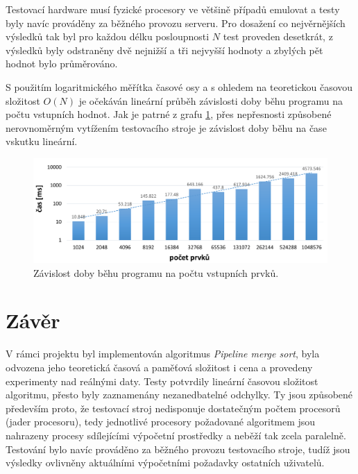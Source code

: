 \documentclass[12pt,a4paper,titlepage,final]{article}
\begin{document}
Testovací hardware musí fyzické procesory ve většině případů emulovat a testy byly navíc prováděny za běžného provozu serveru. Pro dosažení co nejvěrnějších výsledků tak byl pro každou délku posloupnosti $N$ test proveden desetkrát, z výsledků byly odstraněny dvě nejnižší a tři nejvyšší hodnoty a zbylých pět hodnot bylo průměrováno.

S použitím logaritmického měřítka časové osy a s ohledem na teoretickou časovou složitost $O(N)$ je očekáván lineární průběh závislosti doby běhu programu na počtu vstupních hodnot. Jak je patrné z grafu \ref{fig:CasVSPocetPrvku}, přes nepřesnosti způsobené nerovnoměrným vytížením testovacího stroje je závislost doby běhu na čase vskutku lineární.

\begin{figure}[!hbt]
	\centering
	\includegraphics[width=1.0\linewidth]{img/time.pdf}
	\caption{Závislost doby běhu programu na počtu vstupních prvků.}
	\label{fig:CasVSPocetPrvku}
\end{figure}

\section{Závěr}
V rámci projektu byl implementován algoritmus \textit{Pipeline merge sort}, byla odvozena jeho teoretická časová a paměťová složitost i cena a provedeny experimenty nad reálnými daty. Testy potvrdily lineární časovou složitost algoritmu, přesto byly zaznamenány nezanedbatelné odchylky. Ty jsou způsobené především proto, že testovací stroj nedisponuje dostatečným počtem procesorů (jader procesoru), tedy jednotlivé procesory požadované algoritmem jsou nahrazeny procesy sdílejícími výpočetní prostředky a neběží tak zcela paralelně. Testování bylo navíc prováděno za běžného provozu testovacího stroje, tudíž jsou výsledky ovlivněny aktuálními výpočetními požadavky ostatních uživatelů.

\end{document}
